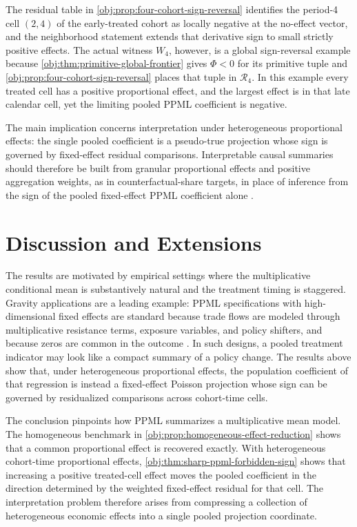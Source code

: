 \documentclass[11pt]{article}
\begin{document}
The residual table in \cref{obj:prop:four-cohort-sign-reversal} identifies the period-4 cell \((2,4)\) of the early-treated cohort as locally negative at the no-effect vector, and the neighborhood statement extends that derivative sign to small strictly positive effects. The actual witness \(W_4\), however, is a global sign-reversal example because \cref{obj:thm:primitive-global-frontier} gives \(\Phi<0\) for its primitive tuple and \cref{obj:prop:four-cohort-sign-reversal} places that tuple in \(\mathcal R_4\). In this example every treated cell has a positive proportional effect, and the largest effect is in that late calendar cell, yet the limiting pooled PPML coefficient is negative.

The main implication concerns interpretation under heterogeneous proportional effects: the single pooled coefficient is a pseudo-true projection whose sign is governed by fixed-effect residual comparisons. Interpretable causal summaries should therefore be built from granular proportional effects and positive aggregation weights, as in counterfactual-share targets, in place of inference from the sign of the pooled fixed-effect PPML coefficient alone \citep{MoreauKastler2025PTT,Wooldridge2023NonlinearDiD,RothSantAnna2023}.


\section{Discussion and Extensions}

The results are motivated by empirical settings where the multiplicative conditional mean is substantively natural and the treatment timing is staggered. Gravity applications are a leading example: PPML specifications with high-dimensional fixed effects are standard because trade flows are modeled through multiplicative resistance terms, exposure variables, and policy shifters, and because zeros are common in the outcome \citep{AndersonVanWincoop2003,HeadMayer2014,YotovPiermartiniMonteiroLarch2016,SantosSilvaTenreyro2006,SantosSilvaTenreyro2011,CorreiaGuimaraesZylkin2020}. In such designs, a pooled treatment indicator may look like a compact summary of a policy change. The results above show that, under heterogeneous proportional effects, the population coefficient of that regression is instead a fixed-effect Poisson projection whose sign can be governed by residualized comparisons across cohort-time cells.

The conclusion pinpoints how PPML summarizes a multiplicative mean model. The homogeneous benchmark in \cref{obj:prop:homogeneous-effect-reduction} shows that a common proportional effect is recovered exactly. With heterogeneous cohort-time proportional effects, \cref{obj:thm:sharp-ppml-forbidden-sign} shows that increasing a positive treated-cell effect moves the pooled coefficient in the direction determined by the weighted fixed-effect residual for that cell. The interpretation problem therefore arises from compressing a collection of heterogeneous economic effects into a single pooled projection coordinate.
\end{document}
